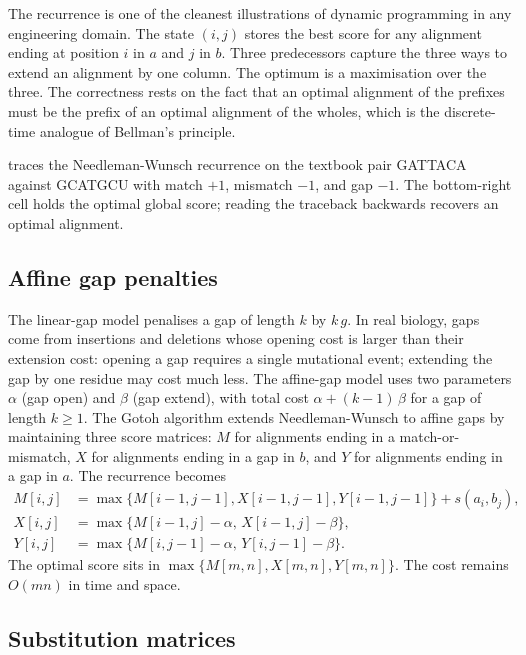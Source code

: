 The recurrence is one of the cleanest illustrations of dynamic
programming in any engineering domain. The state $(i,j)$ stores the
best score for any alignment ending at position $i$ in $a$ and $j$ in
$b$. Three predecessors capture the three ways to extend an alignment
by one column. The optimum is a maximisation over the three. The
correctness rests on the fact that an optimal alignment of the prefixes
must be the prefix of an optimal alignment of the wholes, which is
the discrete-time analogue of Bellman's principle.

 traces the Needleman-Wunsch recurrence
on the textbook pair GATTACA against GCATGCU with match $+1$, mismatch
$-1$, and gap $-1$. The bottom-right cell holds the optimal global
score; reading the traceback backwards recovers an optimal alignment.



\subsection{Affine gap penalties}

The linear-gap model penalises a gap of length $k$ by $k\,g$. In real
biology, gaps come from insertions and deletions whose opening cost is
larger than their extension cost: opening a gap requires a single
mutational event; extending the gap by one residue may cost much less.
The affine-gap model uses two parameters $\alpha$ (gap open) and $\beta$
(gap extend), with total cost $\alpha + (k-1)\,\beta$ for a gap of
length $k\geq 1$. The Gotoh algorithm extends Needleman-Wunsch to
affine gaps by maintaining three score matrices: $M$ for alignments
ending in a match-or-mismatch, $X$ for alignments ending in a gap in
$b$, and $Y$ for alignments ending in a gap in $a$. The recurrence
becomes
\begin{align*}
M[i,j] &= \max\{ M[i-1,j-1], X[i-1,j-1], Y[i-1,j-1] \} + s(a_i, b_j), \\
X[i,j] &= \max\{ M[i-1,j] - \alpha,\, X[i-1,j] - \beta \}, \\
Y[i,j] &= \max\{ M[i,j-1] - \alpha,\, Y[i,j-1] - \beta \}.
\end{align*}
The optimal score sits in $\max\{M[m,n], X[m,n], Y[m,n]\}$. The cost
remains $O(mn)$ in time and space.

\subsection{Substitution matrices}

